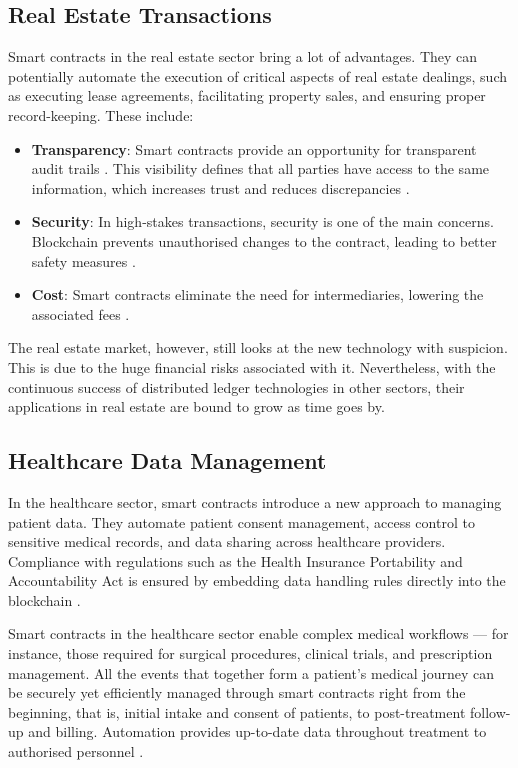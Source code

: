 \subsection{Real Estate Transactions}

Smart contracts in the real estate sector bring a lot of advantages. They can potentially automate the execution of critical aspects of real estate dealings, such as executing lease agreements, facilitating property sales, and ensuring proper record-keeping. These include:

\begin{itemize}
    \item \textbf{Transparency}: Smart contracts provide an opportunity for transparent audit trails \cite{LaarabiEtAl2022}. This visibility defines that all parties have access to the same information, which increases trust and reduces discrepancies \cite{MohantaEtAl2018}.
    \item \textbf{Security}: In high-stakes transactions, security is one of the main concerns. Blockchain prevents unauthorised changes to the contract, leading to better safety measures \cite{UllahEtAl2023, LaarabiEtAl2022}.
    \item \textbf{Cost}: Smart contracts eliminate the need for intermediaries, lowering the associated fees \cite{UzairEtAl2018, MohantaEtAl2018}.
\end{itemize}

The real estate market, however, still looks at the new technology with suspicion. This is due to the huge financial risks associated with it. Nevertheless, with the continuous success of distributed ledger technologies in other sectors, their applications in real estate are bound to grow as time goes by.

\subsection{Healthcare Data Management}

In the healthcare sector, smart contracts introduce a new approach to managing patient data. They automate patient consent management, access control to sensitive medical records, and data sharing across healthcare providers. Compliance with regulations such as the Health Insurance Portability and Accountability Act is ensured by embedding data handling rules directly into the blockchain \cite{Khatoon2020}.

Smart contracts in the healthcare sector enable complex medical workflows — for instance, those required for surgical procedures, clinical trials, and prescription management. All the events that together form a patient's medical journey can be securely yet efficiently managed through smart contracts right from the beginning, that is, initial intake and consent of patients, to post-treatment follow-up and billing. Automation provides up-to-date data throughout treatment to authorised personnel \cite{Khatoon2020}.

